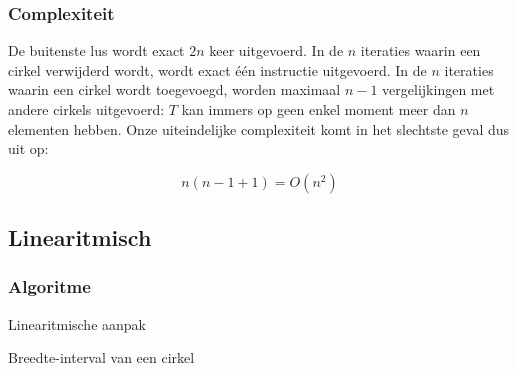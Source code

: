 \subsubsection{Complexiteit}
De buitenste lus wordt exact $2n$ keer uitgevoerd. In de $n$ iteraties
waarin een cirkel verwijderd wordt, wordt exact \'e\'en instructie
uitgevoerd. In de $n$ iteraties waarin een cirkel wordt toegevoegd,
worden maximaal $n - 1$ vergelijkingen met andere cirkels uitgevoerd:
$T$ kan immers op geen enkel moment meer dan $n$ elementen
hebben. Onze uiteindelijke complexiteit komt in het slechtste geval dus uit op:

\[ n (n - 1 + 1) = O(n^2) \]


\subsection{Linearitmisch}
\label{sec:linearitmisch}

\subsubsection{Algoritme}

\begin{algorithm}[H]
  \SetAlgoLined
  \label{algo:linearithmic}
  \caption{Linearitmische aanpak}
\end{algorithm}

\begin{algorithm}[H]
  \SetAlgoLined
  \caption{Breedte-interval van een cirkel}
  \label{algo:interval}
\end{algorithm}

